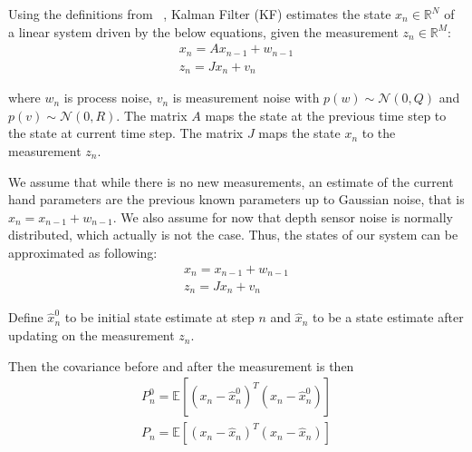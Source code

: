 \documentclass[10pt,twocolumn,letterpaper]{article}
\begin{document}
Using the definitions from ~\cite{welch1995introduction}, Kalman Filter (KF) estimates the state $x_n \in \mathbb{R}^N$ of a linear system driven by the below equations, given the measurement $z_n \in \mathbb{R}^M$:
\begin{align}
x_n = A x_{n - 1} +  w_{n - 1} \\
z_n = J x_n + v_n
\end{align}

where $w_n$ is process noise, $v_n$ is measurement noise with $p(w) \sim \mathcal{N}(0, Q)$ and $p(v) \sim \mathcal{N}(0, R)$. 
The matrix $A$ maps the state at the previous time step to the state at current time step. The matrix $J$ maps the state $x_n$ to the measurement $z_n$.

We assume that while  there is no new measurements, an estimate of the current hand parameters are the previous known parameters up to Gaussian noise, that is $x_n = x_{n-1} + w_{n-1}$. We also assume for now that depth sensor noise is normally distributed, which actually is not the case. Thus, the states of our system can be approximated as following:
\begin{align}
x_n = x_{n - 1} + w_{n - 1} \\
z_n = J x_n + v_n
\end{align}

Define $\hat{x}_n^0$ to be initial state estimate at step $n$ and $\hat{x}_n$ to be a state estimate after updating on the measurement $z_n$.

Then the covariance before and after the measurement is then 
\begin{align}
P_n^0=\mathbb{E}[(x_n - \hat{x}_n^0)^T(x_n - \hat{x}_n^0)]\\
P_n =\mathbb{E}[(x_n - \hat{x}_n)^T(x_n - \hat{x}_n)]
\end{align}

\begin{table}[!h] 
\centering
\caption{Time and measurement update for KF with $A$ equal to identity} 
\end{table}
\end{document}

